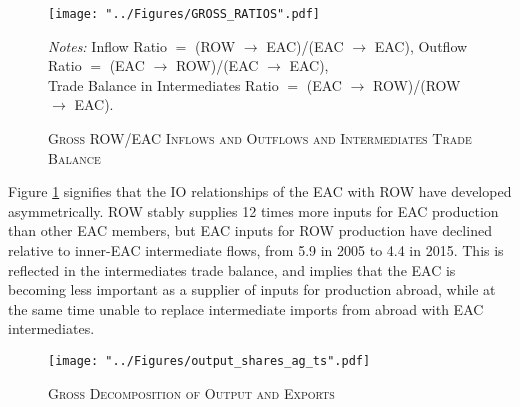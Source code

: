 \documentclass[a4paper]{article}
\begin{document}
\begin{figure}[h!]
\centering
\caption{\label{fig:GR}\textsc{Gross ROW/EAC Inflows and Outflows and Intermediates Trade Balance}}
\texttt{[image: "../Figures/GROSS\_RATIOS".pdf]} %
\raggedright
\scriptsize
\emph{Notes:} Inflow Ratio $=$ (ROW $\to$ EAC)/(EAC $\to$ EAC), Outflow Ratio $=$ (EAC $\to$ ROW)/(EAC $\to$ EAC),\\ \hphantom{Notes:.} Trade Balance in Intermediates Ratio $=$ (EAC $\to$ ROW)/(ROW $\to$ EAC). 
\end{figure}
\FloatBarrier

Figure \ref{fig:GR} signifies that the IO relationships of the EAC with ROW have developed asymmetrically. ROW stably supplies 12 times more inputs for EAC production than other EAC members, but EAC inputs for ROW production have declined relative to inner-EAC intermediate flows, from 5.9 in 2005 to 4.4 in 2015. This is reflected in the intermediates trade balance, and implies that the EAC is becoming less important as a supplier of inputs for production abroad, while at the same time unable to replace intermediate imports from abroad with EAC intermediates.

\begin{figure}[h!] \vspace{-2mm}
\centering
\caption{\label{fig:outshares_ag_ts}\textsc{Gross Decomposition of Output and Exports}}
\texttt{[image: "../Figures/output\_shares\_ag\_ts".pdf]} %
\vspace{-1.5cm}
\end{figure}
\FloatBarrier
\end{document}
